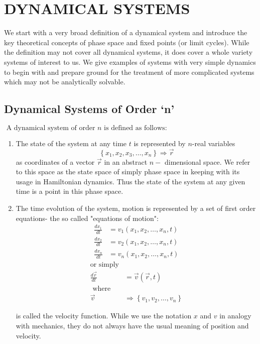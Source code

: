 \chapter{DYNAMICAL SYSTEMS}
We start with a very broad definition of a dynamical system and introduce the key theoretical concepts of phase space and fixed points (or limit cycles). While the definition may not cover all dynamical systems, it does cover a whole variety systems of interest to us. We give examples of systems with very simple dynamics to begin with and prepare ground for the treatment of more complicated systems which may not be analytically solvable.
\section{ Dynamical Systems of Order `n'}
$\text { A dynamical system of order } n \text { is defined as follows: }$
\begin{enumerate}
	\item The state of the system at any time $t$ is represented by $n$-real variables
	$$
	\left\{x_{1}, x_{2}, x_{3}, \ldots, x_{n}\right\} \Rightarrow \vec{r}
	$$
	as coordinates of a vector $\vec{r}$ in an abstract $n-$ dimensional space. We refer to this space as the state space of simply phase space in keeping with its usage in Hamiltonian dynamics. Thus the state of the system at any given time is a point in this phase space.
	\item The time evolution of the system, motion is represented by a set of first order equations- the so called "equations of motion":
	\begin{align}
	\frac{d x_{1}}{d t} &=v_{1}\left(x_{1}, x_{2}, \ldots, x_{n}, t\right) \\
	\frac{d x_{2}}{d t} &=v_{2}\left(x_{1}, x_{2}, \ldots, x_{n}, t\right) \\
	\frac{d x_{n}}{d t} &=v_{n}\left(x_{1}, x_{2}, \ldots, x_{n}, t\right)
	\end{align}
	\begin{align*}
	\text{or simply}\\
	\frac{d \vec{r}}{d t}&=\vec{v}(\vec{r}, t)\\
\text{	where}\\
	\vec{v} &\Rightarrow\left\{v_{1}, v_{2}, \ldots, v_{n}\right\}
	\end{align*}

	is called the velocity function. While we use the notation $x$ and $v$ in analogy with mechanics, they do not always have the usual meaning of position and velocity.
\end{enumerate}
